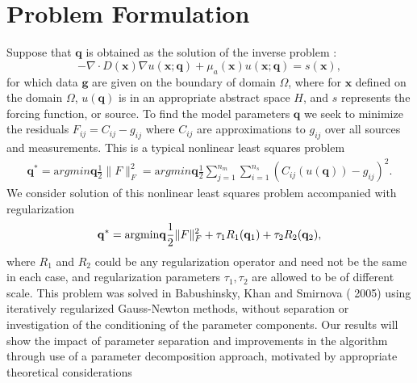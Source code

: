 \documentclass{report}
\begin{document}
\section{Problem Formulation}
Suppose that ${\mathbf q}$ is obtained as the solution of the inverse problem :
\begin{equation}
-\nabla\cdot D({\mathbf x})\nabla u({\mathbf x};{\mathbf q})
+\mu_a({\mathbf x})u({\mathbf x};{\mathbf q})=s({\mathbf x}),
\label{eq:forwardprob}
\end{equation}
for which data $\mathbf g$ are given on the boundary of domain $\Omega$,
where for ${\mathbf x}$ defined on the domain $\Omega$, $u({\mathbf q})$
is in an appropriate abstract space $H$, and $s$ represents the forcing
function, or source. To find the model parameters ${\mathbf q}$ we seek
to minimize the residuals $F_{ij}=C_{ij}-g_{ij}$ where $C_{ij}$ are
approximations to $g_{ij}$ over all sources and measurements. This is a
typical nonlinear least squares problem
\begin{eqnarray}
{\mathbf q}^* = {\mathrm argmin}{{\mathbf q}}\frac{1}{2}\|F\|_F^2
={\mathrm argmin}{{\mathbf q}}\frac{1}{2}\sum \limits_{j=1}^{n_m}\sum
\limits_{i=1}^{n_s} (C_{ij}(u({\mathbf q}))-g_{ij})^2.
\label{eq:nlscost}
\end{eqnarray}
We consider solution of this nonlinear least squares problem accompanied
with regularization
\begin{equation}
{\mathbf q}^* = {\rm argmin}{{\mathbf q}}\frac{1}{2}\|F\|_F^2 + \tau_1
R_1({\mathbf q}_1) +\tau_2 R_2({\mathbf q}_2 ),
\label{eq:decreg}
\end{equation}
where $R_1$ and $R_2$ could be any regularization operator and need not
be the same in each case, and regularization parameters $\tau_1, \tau_2$
are allowed to be of different scale. This problem was solved in
Babushinsky, Khan and Smirnova ( 2005) using iteratively regularized
Gauss-Newton methods, without separation or investigation of the
conditioning of the parameter components. Our results will show the
impact of parameter separation and improvements in the algorithm through
use of a parameter decomposition approach, motivated by appropriate
theoretical considerations
\end{document}
